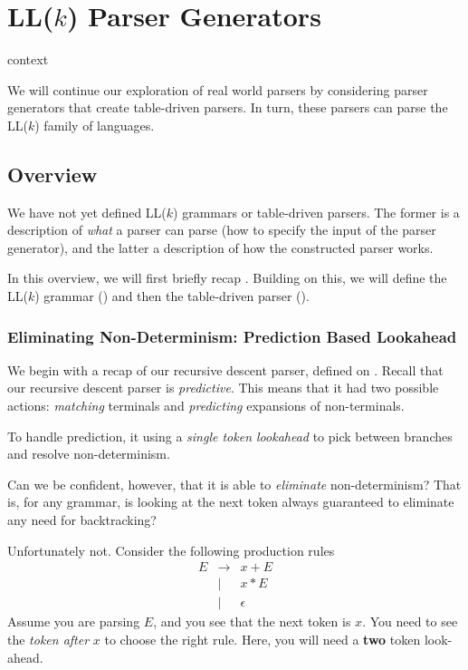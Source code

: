 \chapter{LL($k$) Parser Generators}\label{chapter:llk}

\begin{center}
    {context}
\end{center}

We will continue our exploration of real world parsers by considering parser generators that create table-driven parsers. In turn, these parsers can parse the LL($k$) family of languages. 

\section{Overview}
We have not yet defined LL($k$) grammars or table-driven parsers. The former is a description of \textit{what} a parser can parse (how to specify the input of the parser generator), and the latter a description of how the constructed parser works.

In this overview, we will first briefly recap . Building on this, we will define the LL($k$) grammar () and then the table-driven parser ().

\subsection{Eliminating Non-Determinism: Prediction Based Lookahead}\label{section:combinator-recap}
We begin with a recap of our recursive descent parser, defined on . Recall that our recursive descent parser is \textit{predictive}. This means that it had two possible actions: \textit{matching} terminals and \textit{predicting} expansions of non-terminals.

To handle prediction, it using a \textit{single token lookahead} to pick between branches and resolve non-determinism.

Can we be confident, however, that it is able to \textit{eliminate} non-determinism? That is, for any grammar, is looking at the next token always guaranteed to eliminate any need for backtracking? 

Unfortunately not. Consider the following production rules 
\[\begin{array}{rcl}
     E&\to&x+E  \\
     &\mid &x*E \\ 
     &\mid &\epsilon
\end{array}\]
Assume you are parsing $E$, and you see that the next token is $x$. You need to see the \textit{token after} $x$ to choose the right rule. Here, you will need a \textbf{two} token look-ahead.


